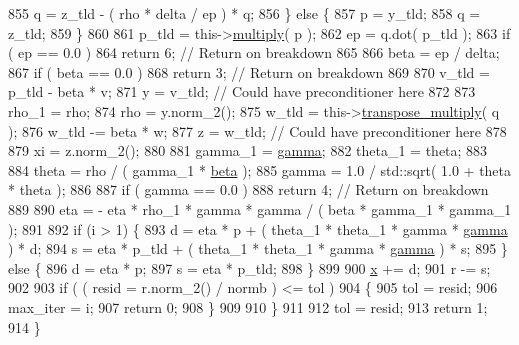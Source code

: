 \begin{DoxyCode}
855         q = z\_tld - ( rho * delta / ep ) * q;
856       \} \textcolor{keywordflow}{else} \{
857         p = y\_tld;
858         q = z\_tld;
859       \}
860 
861       p\_tld = this->\hyperlink{classLuna_1_1SparseMatrix_a532c8a8b80b0accf950a642344e7954f}{multiply}( p );
862       ep = q.dot( p\_tld );
863       \textcolor{keywordflow}{if} ( ep == 0.0 )
864         \textcolor{keywordflow}{return} 6;                       \textcolor{comment}{// Return on breakdown}
865 
866       beta = ep / delta;
867       \textcolor{keywordflow}{if} ( beta == 0.0 )
868         \textcolor{keywordflow}{return} 3;                       \textcolor{comment}{// Return on breakdown}
869 
870       v\_tld = p\_tld - beta * v;
871       y = v\_tld; \textcolor{comment}{// Could have preconditioner here}
872 
873       rho\_1 = rho;
874       rho = y.norm\_2();
875       w\_tld = this->\hyperlink{classLuna_1_1SparseMatrix_a64e3d0328b1eaba4f2f75e70b4fe1bb8}{transpose\_multiply}( q );
876       w\_tld -= beta * w;
877       z = w\_tld; \textcolor{comment}{// Could have preconditioner here}
878 
879       xi = z.norm\_2();
880 
881       gamma\_1 = \hyperlink{namespaceLuna_a4467788060a97debe131fa8f08a00de3}{gamma};
882       theta\_1 = theta;
883 
884       theta = rho / ( gamma\_1 * \hyperlink{namespaceLuna_af542f1c7522ca96017105e160b54df80}{beta} );
885       gamma = 1.0 / std::sqrt( 1.0 + theta * theta );
886 
887       \textcolor{keywordflow}{if} ( gamma == 0.0 )
888         \textcolor{keywordflow}{return} 4;                       \textcolor{comment}{// Return on breakdown}
889 
890       eta = - eta * rho\_1 * gamma * gamma / ( beta * gamma\_1 * gamma\_1 );
891 
892       \textcolor{keywordflow}{if} (i > 1) \{
893         d = eta * p + ( theta\_1 * theta\_1 * gamma * \hyperlink{namespaceLuna_a4467788060a97debe131fa8f08a00de3}{gamma} ) * d;
894         s = eta * p\_tld + ( theta\_1 * theta\_1 * gamma * \hyperlink{namespaceLuna_a4467788060a97debe131fa8f08a00de3}{gamma} ) * s;
895       \} \textcolor{keywordflow}{else} \{
896         d = eta * p;
897         s = eta * p\_tld;
898       \}
899 
900       \hyperlink{namespaceHeat__plot_aa88370c16b85b784ccbde3ed88bc1991}{x} += d;
901       r -= s;
902 
903       \textcolor{keywordflow}{if} ( ( resid = r.norm\_2() / normb ) <= tol )
904       \{
905         tol = resid;
906         max\_iter = i;
907         \textcolor{keywordflow}{return} 0;
908       \}
909 
910     \}
911 
912     tol = resid;
913     \textcolor{keywordflow}{return} 1;
914   \}
\end{DoxyCode}
\mbox{\label{classLuna_1_1SparseMatrix_a7d7f39bd0b3ef94abc483ccbfe81dcf2}} 
